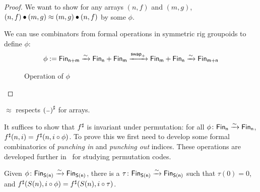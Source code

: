\begin{proof}
    We want to show for any arrays $(n, f)$ and $(m, g)$, $(n, f) \mathbin{\bullet} (m, g) \approx (m, g) \mathbin{\bullet} (n, f)$
    by some $\phi$.

    We can use combinators from formal operations in symmetric rig groupoids \cite{choudhurySymmetriesReversibleProgramming2022} to define $\phi$:
    \begin{align*}
        \phi := \Fin[n+m] \xto{\sim} \Fin[n] + \Fin[m] \xto{\term{swap}_{+}} \Fin[m] + \Fin[n] \xto{\sim} \Fin[m+n] \\
    \end{align*}

    \begin{figure}[H]
        \centering
        \caption{Operation of $\phi$}
        \label{fig:enter-label}
    \end{figure}

\end{proof}

\begin{proposition}
    $\approx$ respects ${({\scriptstyle{-}})}^{\sharp}$ for arrays.
\end{proposition}

It suffices to show that ${f}^{\sharp}$ is invariant under permutation: for all $\phi\colon \Fin[n]\xto{\sim}\Fin[n]$,
$\ext{f}(n, i) \id \ext{f}(n, i \circ \phi)$. To prove this we first need to develop some formal combinatorics of
\emph{punching in} and \emph{punching out} indices. These operations are developed further
in~\cite{choudhurySymmetriesReversibleProgramming2022} for studying permutation codes.

\begin{lemma}\label{bag:tau}
    Given $\phi\colon \Fin[S(n)]\xto{\sim}\Fin[S(n)]$, there is a $\tau\colon \Fin[S(n)]\xto{\sim}\Fin[S(n)]$
    such that $\tau(0) = 0$, and ${f}^{\sharp}(S(n), i \circ \phi) = {f}^{\sharp}(S(n), i \circ \tau)$.
\end{lemma}

